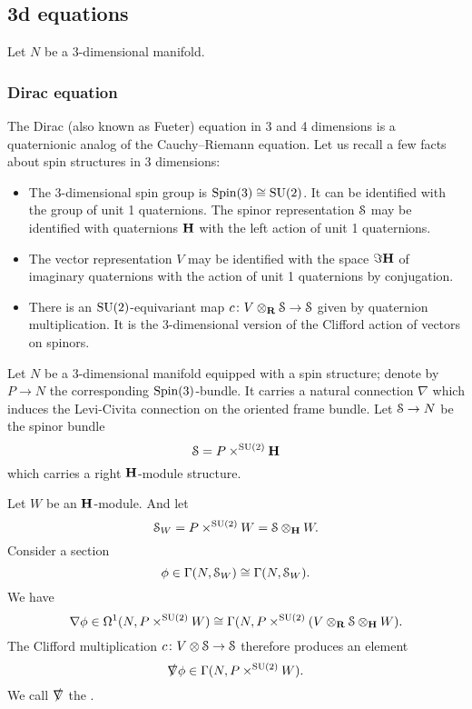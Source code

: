 \subsection{3d equations}

Let $N$ be a 3-dimensional manifold.

\subsubsection{Dirac equation}

The Dirac (also known as Fueter) equation in 3 and 4 dimensions is a quaternionic analog of the Cauchy--Riemann equation. Let us recall a few facts about spin structures in 3 dimensions:
\begin{itemize}
\item The 3-dimensional spin group is $\mathrm{Spin}(3)\cong \mathrm{SU}(2)$. It can be identified with the group of unit 1 quaternions. The spinor representation $\mathcal{S}$ may be identified with quaternions ${\mathbf{H}}$ with the left action of unit 1 quaternions.

\item The vector representation $V$ may be identified with the space $\Im{\mathbf{H}}$ of imaginary quaternions with the action of unit 1 quaternions by conjugation.

\item There is an $\mathrm{SU}(2)$-equivariant map $c\colon V\otimes_{\mathbf{R}} \mathcal{S}\rightarrow \mathcal{S}$ given by quaternion multiplication. It is the 3-dimensional version of the Clifford action of vectors on spinors.
\end{itemize}

Let $N$ be a 3-dimensional manifold equipped with a spin structure; denote by $P\rightarrow N$ the corresponding $\mathrm{Spin}(3)$-bundle. It carries a natural connection $\nabla$ which induces the Levi-Civita connection on the oriented frame bundle. Let $\mathcal{S}\rightarrow N$ be the spinor bundle
\[\mathcal{S} = P\times^{\mathrm{SU}(2)} {\mathbf{H}}\]
which carries a right ${\mathbf{H}}$-module structure. 

Let $W$ be an ${\mathbf{H}}$-module. And let
\[\mathcal{S}_W = P\times^{\mathrm{SU}(2)} W = \mathcal{S}\otimes_{\mathbf{H}} W.\]
Consider a section
\[\phi\in\Gamma(N, \mathcal{S}_W)\cong \Gamma(N, \mathcal{S}_W).\]
We have
\[\nabla\phi\in \Omega^1(N, P\times^{\mathrm{SU}(2)} W)\cong \Gamma(N, P\times^{\mathrm{SU}(2)} (V\otimes_{\mathbf{R}}\mathcal{S}\otimes_{{\mathbf{H}}} W).\]
The Clifford multiplication $c\colon V\otimes \mathcal{S}\rightarrow \mathcal{S}$ therefore produces an element
\[\slashed{\nabla}\phi\in \Gamma(N, P\times^{\mathrm{SU}(2)} W).\]
We call $\slashed{\nabla}$ the .

